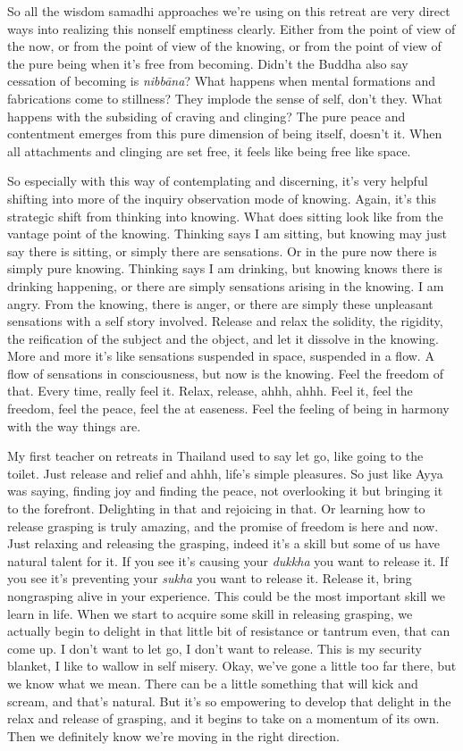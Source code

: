 \documentclass[12pt,openany]{book}
\begin{document}
So all the wisdom samadhi approaches we're using on this retreat are very direct ways into realizing this nonself emptiness clearly. Either from the point of view of the now, or from the point of view of the knowing, or from the point of view of the pure being when it's free from becoming. Didn’t the Buddha also say cessation of becoming is \textit{nibbāna}? What happens when mental formations and fabrications come to stillness? They implode the sense of self, don't they. What happens with the subsiding of craving and clinging? The pure peace and contentment emerges from this pure dimension of being itself,  doesn't it. When all attachments and clinging are set free, it feels like being free like space.

So especially with this way of contemplating and discerning, it's very helpful shifting into more of the inquiry observation mode of knowing. Again, it's this strategic shift from thinking into knowing. What does sitting look like from the vantage point of the knowing. Thinking says I am sitting, but knowing may just say there is sitting, or simply there are sensations. Or in the pure now there is simply pure knowing. Thinking says I am drinking, but knowing knows there is drinking happening, or there are simply sensations arising in the knowing. I am angry. From the knowing, there is anger, or there are simply these unpleasant sensations with a self story involved. Release and relax the solidity, the rigidity, the reification of the subject and the object, and let it dissolve in the knowing. More and more it’s like sensations suspended in space, suspended in a flow. A flow of sensations in consciousness, but now is the knowing. Feel the freedom of that. Every time, really feel it. Relax, release, ahhh, ahhh. Feel it, feel the freedom, feel the peace, feel the at easeness. Feel the feeling of being in harmony with the way things are.

My first teacher on retreats in Thailand used to say let go, like going to the toilet. Just release and relief and ahhh, life's simple pleasures. So just like Ayya was saying, finding joy and finding the peace, not overlooking it but bringing it to the forefront. Delighting in that and rejoicing in that. Or learning how to release grasping is truly amazing, and the promise of freedom is here and now. Just relaxing and releasing the grasping, indeed it's a skill but some of us have natural talent for it. If you see it's causing your \textit{dukkha} you want to release it. If you see it's preventing your \textit{sukha} you want to release it. Release it, bring nongrasping alive in your experience. This could be the most important skill we learn in life. When we start to acquire some skill in releasing grasping, we actually begin to delight in that little bit of resistance or tantrum even, that can come up. I don't want to let go, I don't want to release. This is my security blanket, I like to wallow in self misery. Okay, we've gone a little too far there, but we know what we mean. There can be a little something that will kick and scream, and that's natural. But it’s so empowering to develop that delight in the relax and release of grasping, and it begins to take on a momentum of its own. Then we definitely know we’re moving in the right direction.
\end{document}
